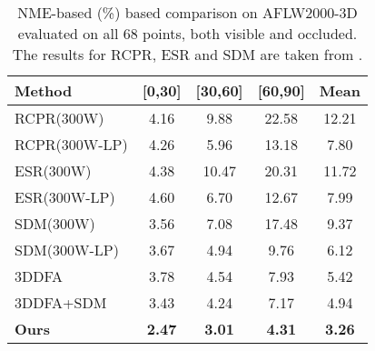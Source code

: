 \documentclass[10pt,journal,compsoc]{IEEEtran}
\begin{document}
\begin{table}[!htbp]
    \caption{NME-based (\%) based comparison on AFLW2000-3D evaluated on all 68 points, both visible and occluded. The results for RCPR, ESR and SDM are taken from \cite{zhu2016face}. }
    \label{tab:compreAFLW2000}
    \renewcommand{\arraystretch}{1.3}
    \centering
    \begin{tabular}{|l|c|c|c|c|}
        \hline
        Method                                  & [0,30]        & [30,60]       & [60,90]       & Mean          \\
        \hline\hline
        RCPR(300W) \cite{burgos2013robust}      & 4.16          & 9.88          & 22.58         & 12.21         \\
        RCPR(300W-LP) \cite{burgos2013robust}   & 4.26          & 5.96          & 13.18         & 7.80          \\
        ESR(300W) \cite{cao2014face}            & 4.38          & 10.47         & 20.31         & 11.72         \\
        ESR(300W-LP) \cite{cao2014face}         & 4.60          & 6.70          & 12.67         & 7.99          \\
        SDM(300W) \cite{xiong2013supervised}    & 3.56          & 7.08          & 17.48         & 9.37          \\
        SDM(300W-LP) \cite{xiong2013supervised} & 3.67          & 4.94          & 9.76          & 6.12          \\
        3DDFA \cite{zhu2016face}                & 3.78          & 4.54          & 7.93          & 5.42          \\
        3DDFA+SDM \cite{zhu2016face}            & 3.43          & 4.24          & 7.17          & 4.94          \\
        \hline
        \textbf{Ours}                           & \textbf{2.47} & \textbf{3.01} & \textbf{4.31} & \textbf{3.26} \\
        \hline
    \end{tabular} 
\end{table}
\end{document}
